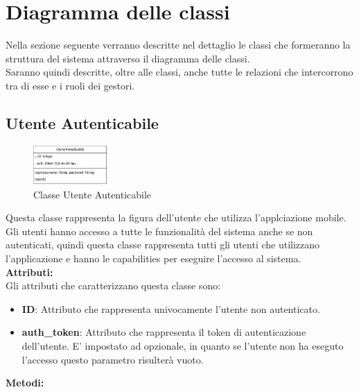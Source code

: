 \section{Diagramma delle classi}

Nella sezione seguente verranno descritte nel dettaglio le classi che formeranno la struttura del sistema attraverso il diagramma delle classi.\\
Saranno quindi descritte, oltre alle classi, anche tutte le relazioni che intercorrono tra di esse e i ruoli dei gestori.\\

\subsection{Utente Autenticabile}

\begin{figure}[htbp]
    \centering
    \includegraphics[width=0.25\textwidth]{Images/UtenteAutenticabile-Class.png}
    \caption{Classe Utente Autenticabile}
    \label{fig:UtenteAutenticabile}
\end{figure}

Questa classe rappresenta la figura dell'utente che utilizza l'applciazione mobile.\\
Gli utenti hanno accesso a tutte le funzionalità del sistema anche se non autenticati, quindi questa classe rappresenta tutti gli utenti che utilizzano l'applicazione e hanno le capabilities per eseguire l'accesso al sistema.\\

\textbf{Attributi:}\\

Gli attributi che caratterizzano questa classe sono:
\begin{itemize}
    \item \textbf{ID}: Attributo che rappresenta univocamente l'utente non autenticato.
    \item \textbf{auth\_token}: Attributo che rappresenta il token di autenticazione dell'utente. E' impostato ad opzionale, in quanto se l'utente non ha eseguto l'accesso questo parametro risulterà vuoto.
\end{itemize}
 
\textbf{Metodi:}\\

